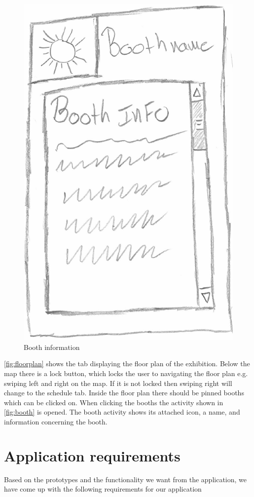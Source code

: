 \begin{figure}[H]
\begin{minipage}[b]{0.5\columnwidth}
\includegraphics[width=0.7\columnwidth]{img/prototype/8.png}
\caption{Booth information\label{fig:booth}}
\end{minipage}
\end{figure}

\autoref{fig:floorplan} shows the tab displaying the floor plan of the exhibition. Below the map there is a lock button, which locks the user to navigating the floor plan e.g. swiping left and right on the map. If it is not locked then swiping right will change to the schedule tab. Inside the floor plan there should be pinned booths which can be clicked on. When clicking the booths the activity shown in \autoref{fig:booth} is opened. The booth activity shows its attached icon, a name, and information concerning the booth.

\section{Application requirements}
Based on the prototypes and the functionality we want from the application, we have come up with the following requirements for our application

